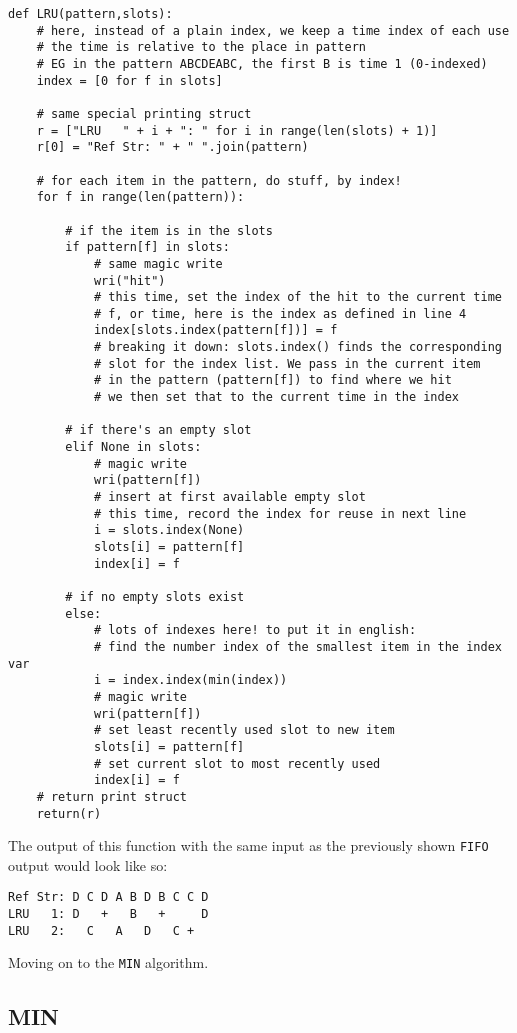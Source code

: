 \documentclass[11pt]{article}
\begin{document}
\begin{lstlisting}
def LRU(pattern,slots):
	# here, instead of a plain index, we keep a time index of each use
	# the time is relative to the place in pattern
	# EG in the pattern ABCDEABC, the first B is time 1 (0-indexed)
	index = [0 for f in slots]

	# same special printing struct
	r = ["LRU   " + i + ": " for i in range(len(slots) + 1)]
	r[0] = "Ref Str: " + " ".join(pattern)

	# for each item in the pattern, do stuff, by index!
	for f in range(len(pattern)):

		# if the item is in the slots
		if pattern[f] in slots:
			# same magic write
			wri("hit")
			# this time, set the index of the hit to the current time
			# f, or time, here is the index as defined in line 4
			index[slots.index(pattern[f])] = f
			# breaking it down: slots.index() finds the corresponding
			# slot for the index list. We pass in the current item
			# in the pattern (pattern[f]) to find where we hit
			# we then set that to the current time in the index

		# if there's an empty slot
		elif None in slots:
			# magic write
			wri(pattern[f])
			# insert at first available empty slot
			# this time, record the index for reuse in next line
			i = slots.index(None)
			slots[i] = pattern[f]
			index[i] = f

		# if no empty slots exist
		else:
			# lots of indexes here! to put it in english:
			# find the number index of the smallest item in the index var
			i = index.index(min(index))
			# magic write
			wri(pattern[f])
			# set least recently used slot to new item
			slots[i] = pattern[f]
			# set current slot to most recently used
			index[i] = f
	# return print struct
	return(r)

\end{lstlisting}

The output of this function with the same input as the previously shown \texttt{FIFO} output would look like so:
\vspace{-2em}

\begin{lstlisting}
Ref Str: D C D A B D B C C D
LRU   1: D   +   B   +     D
LRU   2:   C   A   D   C +
\end{lstlisting}

Moving on to the \texttt{MIN} algorithm.

\subsection{MIN}
\end{document}
